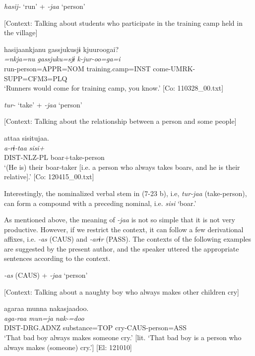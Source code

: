 \ea \label{ex:7:23}\ea \label{ex:7:a}\textit{hasij-} ‘run’ + \textit{{}-jaa} ‘person’

    [Context: Talking about students who participate in the training camp held in the village]

\glll  hasijaankjanu  {\textbar}gassjuku{\textbar}sjɨ  kjuuroogai?\\
\textit{=nkja=nu}  \textit{gassjuku=sjɨ}  \textit{k-jur-oo=ga=i}\\
run-person=APPR=NOM  training.camp=INST  come-UMRK-SUPP=CFM3=PLQ\\
\glt ‘Runners would come for training camp, you know.’ [Co: 110328\_00.txt]

\ex \label{ex:7:b}\textit{tur-} ‘take’ + \textit{{}-jaa} ‘person’

    [Context: Talking about the relationship between a person and some people]

\glll  attaa   sisitujaa.\\
\textit{a-rɨ-taa}  \textit{sisi+}\\
DIST-NLZ-PL  boar+take-person\\
\glt ‘(He is) their boar-taker [i.e. a person who always takes boars, and he is their relative].’ [Co: 120415\_00.txt]
\z
\z

Interestingly, the nominalized verbal stem in (7-23 b), i.e, \textit{tur-jaa} (take-person), can form a compound with a preceding nominal, i.e. \textit{sisi} ‘boar.’

As mentioned above, the meaning of \textit{{}-jaa} is not so simple that it is not very productive. However, if we restrict the context, it can follow a few derivational affixes, i.e. \textit{{}-as} (CAUS) and \textit{{}-arɨr} (PASS). The contexts of the following examples are suggested by the present author, and the speaker uttered the appropriate sentences according to the context.

\ea \label{ex:7:24}
\ea \label{ex:7:24a}\textit{{}-as} (CAUS) + \textit{{}-jaa} ‘person’

    [Context: Talking about a naughty boy who always makes other children cry]

\glll  agaraa  munna  nakasjaadoo.\\
\textit{aga-raa}  \textit{mun=ja}  \textit{nak-=doo}\\
DIST-DRG.ADNZ  substance=TOP  cry-CAUS-person=ASS\\
\glt ‘That bad boy always makes someone cry.’ [lit. ‘That bad boy is a person who always makes (someone) cry.’] [El: 121010]

